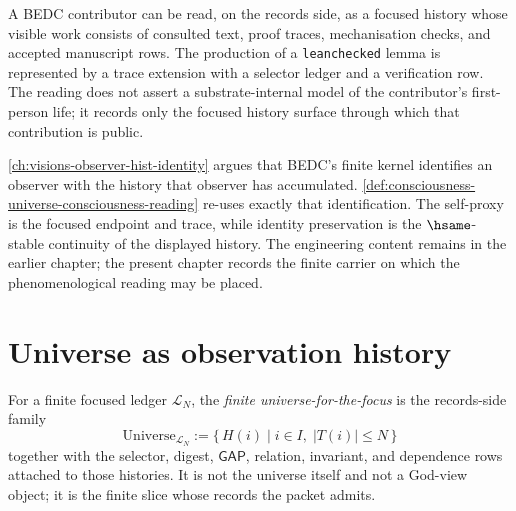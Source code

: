 \begin{example}
\label{ex:consciousness-universe-bedc-author}
A BEDC contributor can be read, on the records side, as a focused history whose visible work consists of consulted text, proof traces, mechanisation checks, and accepted manuscript rows. The production of a \texttt{leanchecked} lemma is represented by a trace extension with a selector ledger and a verification row. The reading does not assert a substrate-internal model of the contributor's first-person life; it records only the focused history surface through which that contribution is public.
\end{example}

\begin{remark}
\label{rem:consciousness-universe-relation-implicit-metaphysics}
\autoref{ch:visions-observer-hist-identity} argues that BEDC's finite kernel identifies an observer with the history that observer has accumulated. \autoref{def:consciousness-universe-consciousness-reading} re-uses exactly that identification. The self-proxy is the focused endpoint and trace, while identity preservation is the $\hsame$-stable continuity of the displayed history. The engineering content remains in the earlier chapter; the present chapter records the finite carrier on which the phenomenological reading may be placed.
\end{remark}


\section{Universe as observation history}
\label{sec:consciousness-universe-universe-as-history}

\begin{definition}
\label{def:consciousness-universe-universe-for-observer}
For a finite focused ledger $\mathcal{L}_N$, the \emph{finite universe-for-the-focus} is the records-side family
$$
\mathrm{Universe}_{\mathcal{L}_N}
  := \{\,H(i)\mid i\in I,\; |T(i)|\leq N\,\}
$$
together with the selector, digest, $\mathsf{GAP}$, relation, invariant, and dependence rows attached to those histories. It is not the universe itself and not a God-view object; it is the finite slice whose records the packet admits.
\end{definition}

